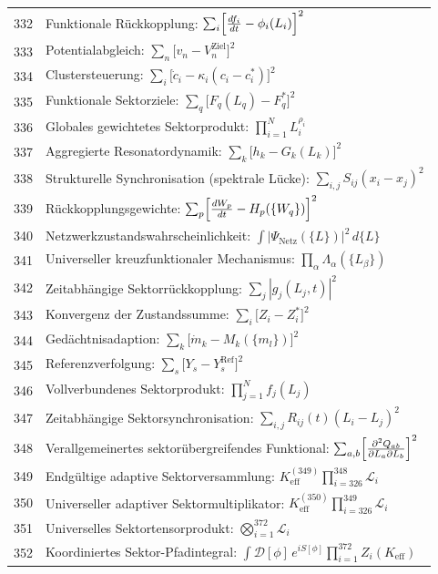 \documentclass[11pt,a4paper]{article}
\begin{document}
\begin{longtable}{r l}
		332 & Funktionale Rückkopplung: $\sum_i\Bigl[\frac{df_i}{dt} - \phi_i(L_i)\Bigr]^2$ \\
		333 & Potentialabgleich: $\sum_n\bigl[v_n - V_n^{\text{Ziel}}\bigr]^2$ \\
		334 & Clustersteuerung: $\sum_i\bigl[\dot c_i - \kappa_i(c_i - c_i^*)\bigr]^2$ \\
		335 & Funktionale Sektorziele: $\sum_q\bigl[F_q(L_q) - F_q^*\bigr]^2$ \\
		336 & Globales gewichtetes Sektorprodukt: $\prod_{i=1}^N L_i^{\rho_i}$ \\
		337 & Aggregierte Resonatordynamik: $\sum_k\bigl[h_k - G_k(L_k)\bigr]^2$ \\
		338 & Strukturelle Synchronisation (spektrale Lücke): $\sum_{i,j}S_{ij}(x_i - x_j)^2$ \\
		339 & Rückkopplungsgewichte: $\sum_p\Bigl[\frac{dW_p}{dt} - H_p(\{W_q\})\Bigr]^2$ \\
		340 & Netzwerkzustandswahrscheinlichkeit: $\int|\Psi_{\text{Netz}}(\{L\})|^2\,d\{L\}$ \\
		341 & Universeller kreuzfunktionaler Mechanismus: $\prod_\alpha\Lambda_\alpha(\{L_\beta\})$ \\
		342 & Zeitabhängige Sektorrückkopplung: $\sum_j|g_j(L_j,t)|^2$ \\
		343 & Konvergenz der Zustandssumme: $\sum_i\bigl[Z_i - Z_i^*\bigr]^2$ \\
		344 & Gedächtnisadaption: $\sum_k\bigl[\dot m_k - M_k(\{m_l\})\bigr]^2$ \\
		345 & Referenzverfolgung: $\sum_s\bigl[Y_s - Y_s^{\text{Ref}}\bigr]^2$ \\
		346 & Vollverbundenes Sektorprodukt: $\prod_{j=1}^N f_j(L_j)$ \\
		347 & Zeitabhängige Sektorsynchronisation: $\sum_{i,j}R_{ij}(t)(L_i - L_j)^2$ \\
		348 & Verallgemeinertes sektorübergreifendes Funktional: $\sum_{a,b}\Bigl[\frac{\partial^2 Q_{ab}}{\partial L_a\partial L_b}\Bigr]^2$ \\
		349 & Endgültige adaptive Sektorversammlung: $K^{(349)}_{\mathrm{eff}}\prod_{i=326}^{348}\mathcal{L}_i$ \\
		350 & Universeller adaptiver Sektormultiplikator: $K^{(350)}_{\mathrm{eff}}\prod_{i=326}^{349}\mathcal{L}_i$ \\
		351 & Universelles Sektortensorprodukt: $\bigotimes_{i=1}^{372}\mathcal{L}_i$ \\
		352 & Koordiniertes Sektor-Pfadintegral: $\int\mathcal{D}[\phi]\,e^{iS[\phi]}\prod_{i=1}^{372}Z_i(K_{\mathrm{eff}})$ \\

\end{longtable}
\end{document}
